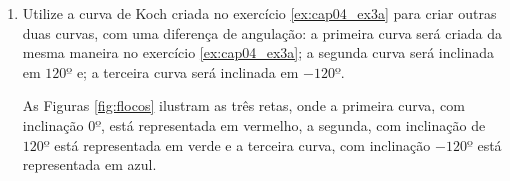 \begin{enumerate}
\begin{enumerate}
\begin{figure}[!htp]
        \end{figure}

  \label{ex:cap03_ex27}

      \item Utilize a curva de Koch criada no exercício \ref{ex:cap04_ex3a} para criar outras duas curvas, com uma diferença de angulação: a primeira curva será criada da mesma maneira no exercício \ref{ex:cap04_ex3a}; a segunda curva será inclinada em $120º$ e; a terceira curva será inclinada em $-120º$. 

      As Figuras \ref{fig:flocos} ilustram as três retas, onde a primeira curva, com inclinação $0º$, está representada em vermelho, a segunda, com inclinação de $120º$ está representada em verde e a terceira curva, com inclinação $-120º$ está representada em azul.
      \label{ex:cap04_ex3b}


\end{enumerate}
\end{enumerate}
